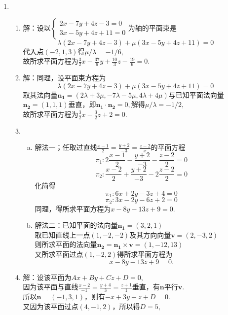 \documentclass[UTF8]{ctexart}
\begin{document}
\begin{enumerate}
\item \begin{enumerate}[(1)]
\item 解：设以$\left\{\begin{array}{l}2x-7y+4z-3=0\\3x-5y+4z+11=0\end{array}\right.$为轴的平面束是$$\lambda\left(2x-7y+4z-3\right)+\mu\left(3x-5y+4z+11\right)=0$$代入点$\left(-2,1,3\right)$得$\mu/\lambda=-1/6,$\\
故所求平面方程为$\displaystyle\frac{3}{2}x-\displaystyle\frac{37}{6}y+\displaystyle\frac{10}{3}z-\displaystyle\frac{19}{6}=0.$
\item 解：同理，设平面束方程为$$\lambda\left(2x-7y+4z-3\right)+\mu\left(3x-5y+4z+11\right)=0$$取其法向量$\mathbf{n_1}=\left(2\lambda+3\mu,-7\lambda-5\mu,4\lambda+4\mu\right)$与已知平面法向量$\mathbf{n_2}=\left(1,1,1\right)$垂直，即$\mathbf{n_1}\cdot\mathbf{n_2}=0,$解得$\mu/\lambda=-1/2,$\\
故所求平面方程为$\displaystyle\frac{3}{2}x-\displaystyle\frac{3}{2}z+2=0.$
\item \begin{enumerate}[(a)]
\item 解法一；任取过直线$\displaystyle\frac{x-1}{2}=\displaystyle\frac{y+2}{-3}=\displaystyle\frac{z-2}{x}$的平面方程$$\pi_1:2\displaystyle\frac{x-1}{2}-\displaystyle\frac{y+2}{-3}-\displaystyle\frac{z-2}{2}=0$$$$\pi_2:\displaystyle\frac{x-2}{2}+\displaystyle\frac{y+2}{-3}-2\displaystyle\frac{z-2}{2}=0$$化简得$$\pi_1:6x+2y-3z+4=0$$$$\pi_2:3x-2y-6z+2=0$$同理，得所求平面方程为$x-8y-13z+9=0.$
\item 解法二：已知平面的法向量$\mathbf{n_1}=\left(3,2,1\right)$\\
取已知直线上一点$\left(1,-2,-2\right)$及其方向向量$\mathbf{v}=\left(2,-3,2\right)$\\
则所求平面的法向量$\mathbf{n_2}=\mathbf{n_1}\times\mathbf{v}=\left(1,-12,13\right)$\\
又所求平面过点$\left(1,-2,2\right)$得所求平面方程为$$x-8y-13z+9=0.$$
\end{enumerate}
\item 解：设该平面为$Ax+By+Cz+D=0$,\\
因为该平面与直线$\displaystyle\frac{x-2}{-1}=\displaystyle\frac{y+4}{3}=\displaystyle\frac{z+1}{1}$垂直，有$\mathbf{n}$平行$\mathbf{v}$.\\
所以$\mathbf{n}=\left(-1,3,1\right)$，则有$-x+3y+z+D=0.$\\
又因为该平面过点$\left(4,-1,2\right)$，所以得$D=5$,\\

\end{enumerate}
\end{enumerate}
\end{document}

